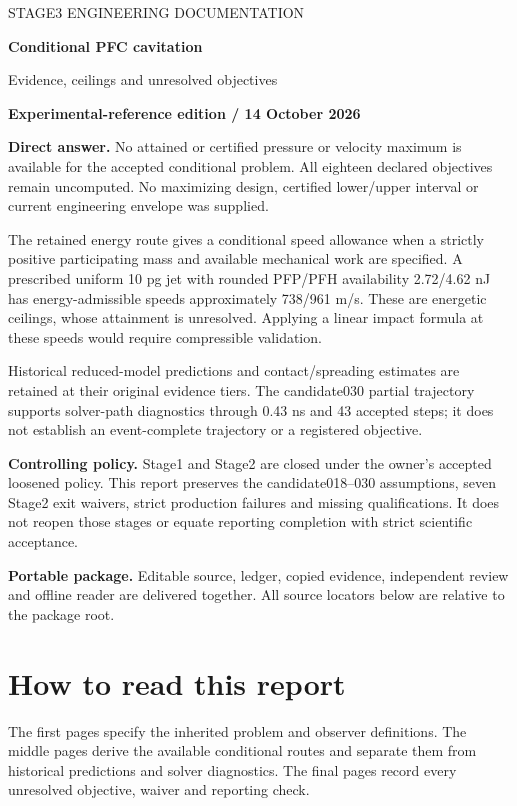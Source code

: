 \documentclass[10pt,a4paper]{article}
\begin{document}
\hypersetup{pageanchor=false}
\begin{titlepage}
\vspace*{18mm}
{\Large\color{teal}STAGE3 ENGINEERING DOCUMENTATION}\par
\vspace{8mm}
{\Huge\bfseries\color{navy}Conditional PFC cavitation}\par
\vspace{4mm}
{\LARGE Evidence, ceilings and unresolved objectives}\par
\vspace{12mm}
\textbf{Experimental-reference edition / 14 October 2026}

\textbf{Direct answer.} No attained or certified pressure or velocity maximum is available for the accepted conditional problem. All eighteen declared objectives remain uncomputed. No maximizing design, certified lower/upper interval or current engineering envelope was supplied.

The retained energy route gives a conditional speed allowance when a strictly positive participating mass and available mechanical work are specified. A prescribed uniform 10 pg jet with rounded PFP/PFH availability 2.72/4.62 nJ has energy-admissible speeds approximately 738/961 m/s. These are energetic ceilings, whose attainment is unresolved. Applying a linear impact formula at these speeds would require compressible validation.

Historical reduced-model predictions and contact/spreading estimates are retained at their original evidence tiers. The candidate030 partial trajectory supports solver-path diagnostics through 0.43 ns and 43 accepted steps; it does not establish an event-complete trajectory or a registered objective.

\vfill
\textbf{Controlling policy.} Stage1 and Stage2 are closed under the owner's accepted loosened policy. This report preserves the candidate018--030 assumptions, seven Stage2 exit waivers, strict production failures and missing qualifications. It does not reopen those stages or equate reporting completion with strict scientific acceptance.

\textbf{Portable package.} Editable source, ledger, copied evidence, independent review and offline reader are delivered together. All source locators below are relative to the package root.
\end{titlepage}
\hypersetup{pageanchor=true}

\section*{How to read this report}
The first pages specify the inherited problem and observer definitions. The middle pages derive the available conditional routes and separate them from historical predictions and solver diagnostics. The final pages record every unresolved objective, waiver and reporting check.
\end{document}
